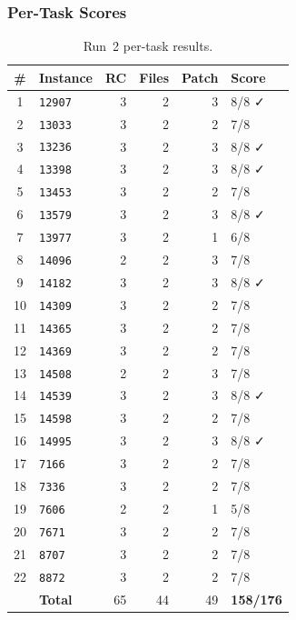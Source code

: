 \subsubsection{Per-Task Scores}

\begin{table}[h]
\centering
\small
\caption{Run~2 per-task results.}\label{tab:r2-tasks}
\setlength{\tabcolsep}{4pt}
\begin{tabular}{clrrrl}
\toprule
\textbf{\#} & \textbf{Instance} & \textbf{RC} & \textbf{Files} & \textbf{Patch} & \textbf{Score} \\
\midrule
 1 & \texttt{12907} & 3 & 2 & 3 & 8/8 ✓ \\
 2 & \texttt{13033} & 3 & 2 & 2 & 7/8 \\
 3 & \texttt{13236} & 3 & 2 & 3 & 8/8 ✓ \\
 4 & \texttt{13398} & 3 & 2 & 3 & 8/8 ✓ \\
 5 & \texttt{13453} & 3 & 2 & 2 & 7/8 \\
 6 & \texttt{13579} & 3 & 2 & 3 & 8/8 ✓ \\
 7 & \texttt{13977} & 3 & 2 & 1 & 6/8 \\
 8 & \texttt{14096} & 2 & 2 & 3 & 7/8 \\
 9 & \texttt{14182} & 3 & 2 & 3 & 8/8 ✓ \\
10 & \texttt{14309} & 3 & 2 & 2 & 7/8 \\
11 & \texttt{14365} & 3 & 2 & 2 & 7/8 \\
12 & \texttt{14369} & 3 & 2 & 2 & 7/8 \\
13 & \texttt{14508} & 2 & 2 & 3 & 7/8 \\
14 & \texttt{14539} & 3 & 2 & 3 & 8/8 ✓ \\
15 & \texttt{14598} & 3 & 2 & 2 & 7/8 \\
16 & \texttt{14995} & 3 & 2 & 3 & 8/8 ✓ \\
17 & \texttt{7166}  & 3 & 2 & 2 & 7/8 \\
18 & \texttt{7336}  & 3 & 2 & 2 & 7/8 \\
19 & \texttt{7606}  & 2 & 2 & 1 & 5/8 \\
20 & \texttt{7671}  & 3 & 2 & 2 & 7/8 \\
21 & \texttt{8707}  & 3 & 2 & 2 & 7/8 \\
22 & \texttt{8872}  & 3 & 2 & 2 & 7/8 \\
\midrule
   & \textbf{Total} & 65 & 44 & 49 & \textbf{158/176} \\
\bottomrule
\end{tabular}
\end{table}

